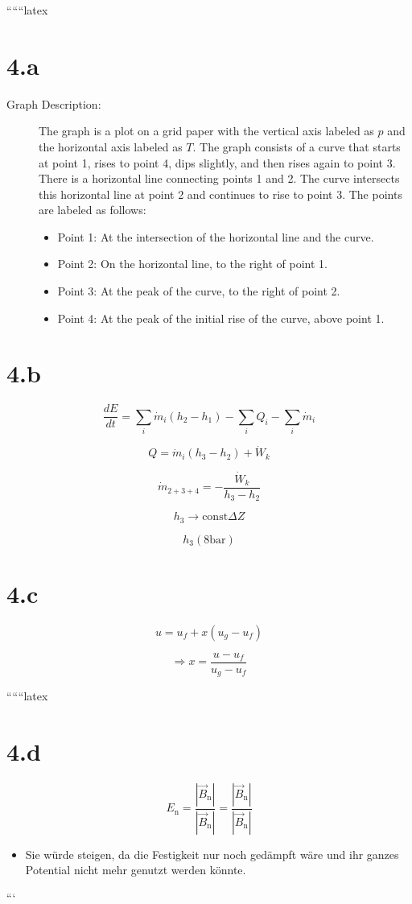 
``````latex


\section*{4.a}

\begin{description}
    \item[Graph Description:] The graph is a plot on a grid paper with the vertical axis labeled as \( p \) and the horizontal axis labeled as \( T \). The graph consists of a curve that starts at point 1, rises to point 4, dips slightly, and then rises again to point 3. There is a horizontal line connecting points 1 and 2. The curve intersects this horizontal line at point 2 and continues to rise to point 3. The points are labeled as follows:
    \begin{itemize}
        \item Point 1: At the intersection of the horizontal line and the curve.
        \item Point 2: On the horizontal line, to the right of point 1.
        \item Point 3: At the peak of the curve, to the right of point 2.
        \item Point 4: At the peak of the initial rise of the curve, above point 1.
    \end{itemize}
\end{description}

\section*{4.b}

\[
\frac{dE}{dt} = \sum_i \dot{m}_i (h_{2} - h_{1}) - \sum_i Q_i - \sum_i \dot{m}_i
\]

\[
Q = \dot{m}_i (h_{3} - h_{2}) + \dot{W}_k
\]

\[
\dot{m}_{2+3+4} = -\frac{\dot{W}_k}{h_{3} - h_{2}}
\]

\[
h_{3} \rightarrow \text{const} \Delta Z
\]

\[
h_{3} (8 \text{bar})
\]

\section*{4.c}

\[
u = u_f + x (u_g - u_f)
\]

\[
\Rightarrow x = \frac{u - u_f}{u_g - u_f}
\]

``````latex


\section*{4.d}
\[
E_{\text{n}} = \frac{| \vec{B}_{\text{n}} |}{| \vec{B}_{\text{n}} |} = \frac{| \vec{B}_{\text{n}} |}{| \vec{B}_{\text{n}} |}
\]

\begin{itemize}
    \item Sie würde steigen, da die Festigkeit nur noch gedämpft wäre und ihr ganzes Potential nicht mehr genutzt werden könnte.
\end{itemize}

```